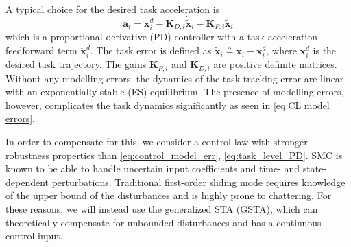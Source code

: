 \documentclass[../main.tex]{subfiles}
\begin{document}
A typical choice for the desired task acceleration is
\begin{equation}
    \label{eq:task_level_PD}
    \bm{a}_i = \ddot{\bm{x}}_i^d - \bm{K}_{D,i} \dot{\tilde{\bm{x}}}_i - \bm{K}_{P,i} \tilde{\bm{x}}_i
 \end{equation}
which is a proportional-derivative (PD) controller with a task acceleration feedforward term $\ddot{\bm{x}}_i^d$. The task error is defined as $\tilde{\bm{x}}_i \triangleq \bm{x}_i-\bm{x}_{i}^d$, where $\bm{x}_{i}^d$ is the desired task trajectory. The gains $\bm{K}_{P,i}$ and $\bm{K}_{D,i}$ are positive definite matrices. Without any modelling errors, the dynamics of the task tracking error are linear with an exponentially stable (ES) equilibrium.
The presence of modelling errors, however, complicates the task dynamics significantly as seen in \eqref{eq:CL model errors}.

In order to compensate for this, we consider a control law with stronger robustness properties than \eqref{eq:control_model_err}, \eqref{eq:task_level_PD}. SMC is known to be able to handle uncertain input coefficients and time- and state-dependent perturbations. Traditional first-order sliding mode requires knowledge of the upper bound of the disturbances and is highly prone to chattering. For these reasons, we will instead use the generalized STA (GSTA), which can theoretically compensate for unbounded disturbances and has a continuous control input.
\end{document}

